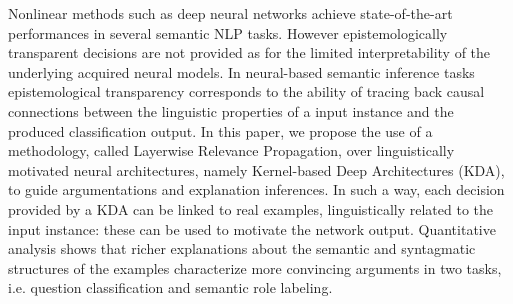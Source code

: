 Nonlinear methods such as deep neural networks achieve state-of-the-art performances in several semantic NLP tasks. However epistemologically transparent decisions are not provided as for the limited interpretability of the underlying acquired neural models. In neural-based semantic inference tasks epistemological transparency corresponds to the ability of tracing back causal connections between the linguistic properties of a input instance and the produced classification output. In this paper, we propose the use of a methodology, called Layerwise Relevance Propagation, over linguistically motivated neural architectures, namely Kernel-based Deep Architectures (KDA), to guide argumentations and explanation inferences. In such a way, each decision provided by a KDA can be linked to real examples, linguistically related to the input instance: these can be used to motivate the network output. Quantitative analysis shows that richer explanations about the semantic and syntagmatic structures of the examples characterize more convincing arguments in two tasks, i.e. question classification and semantic role labeling.
